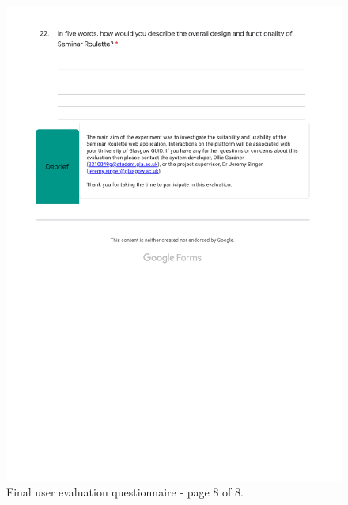 \documentclass{l4proj}
\begin{document}
\begin{appendices}
\begin{figure}[htb]
    \centering
    \includegraphics[width=\linewidth]{images/final_evaluation_8.pdf}    
    \caption{Final user evaluation questionnaire - page 8 of 8.}
    \label{fig:final_evaluation_8} 
\end{figure}

\end{appendices}






\end{document}
